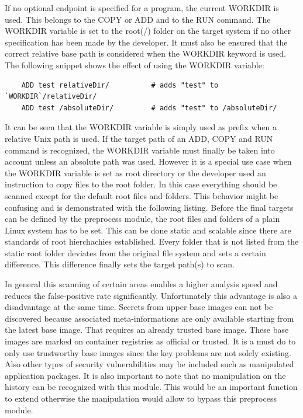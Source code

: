 If no optional endpoint is specified for a program, the current WORKDIR is used. This belongs to the COPY or ADD and to the RUN command.
The WORKDIR variable is set to the root(/) folder on the target system if no other specification has been made by the developer. 
It must also be ensured that the correct relative base path is considered when the WORKDIR keyword is used. 
The following snippet shows the effect of using the WORKDIR variable:
\begin{lstlisting}
	ADD test relativeDir/          # adds "test" to `WORKDIR`/relativeDir/
	ADD test /absoluteDir/         # adds "test" to /absoluteDir/
\end{lstlisting}
It can be seen that the WORKDIR variable is simply used as prefix when a relative Unix path is used.
If the target path of an ADD, COPY and RUN command is recognized, the WORKDIR variable must finally be taken into account unless an absolute path was used.
However it is a special use case when the WORKDIR variable is set as root directory or the developer used an instruction to copy files to the root folder. 
In this case everything should be scanned except for the default root files and folders.
This behavior might be confusing and is demonstrated with the following listing.
Before the final targets can be defined by the preprocess module, the root files and folders of a plain Linux system has to be set. 
This can be done static and scalable since there are standards of root hierchachies established.
Every folder that is not listed from the static root folder deviates from the original file system and sets a certain difference. 
This difference finally sets the target path(s) to scan. 

In general this scanning of certain areas enables a higher analysis speed and reduces the false-positive rate significantly.
Unfortunately this advantage is also a disadvantage at the same time. 
Secrets from upper base images can not be discovered because associated meta-informations are only available starting from the latest base image.
That requires an already trusted base image.
These base images are marked on container registries as official or trusted. 
It is a must do to only use trustworthy base images since the key problems are not solely existing. 
Also other types of security vulnerabilities may be included such as manipulated application packages. 
It is also important to note that no manipulation on the history can be recognized with this module. 
This would be an important function to extend otherwise the manipulation would allow to bypass this preprocess module. 


